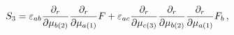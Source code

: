 \begin{equation}
S_{3}=\varepsilon _{ab}\frac{\partial _{r}}{\partial \mu _{b(2)}}\frac{%
\partial _{r}}{\partial \mu _{a(1)}}F+\varepsilon _{ac}\frac{\partial _{r}}{%
\partial \mu _{c(3)}}\frac{\partial _{r}}{\partial \mu _{b(2)}}\frac{%
\partial _{r}}{\partial \mu _{a(1)}}F_{b}\,,  \label{s3new}
\end{equation}

